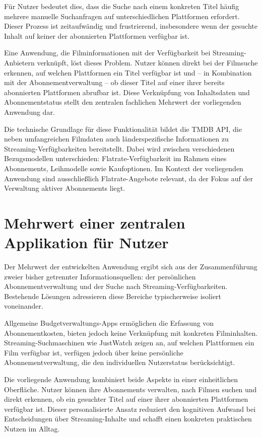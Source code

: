 Für Nutzer bedeutet dies, dass die Suche nach einem konkreten Titel häufig
mehrere manuelle Suchanfragen auf unterschiedlichen Plattformen erfordert.
Dieser Prozess ist zeitaufwändig und frustrierend, insbesondere wenn der
gesuchte Inhalt auf keiner der abonnierten Plattformen verfügbar ist.

Eine Anwendung, die Filminformationen mit der Verfügbarkeit bei
Streaming-Anbietern verknüpft, löst dieses Problem. Nutzer können direkt
bei der Filmsuche erkennen, auf welchen Plattformen ein Titel verfügbar
ist und -- in Kombination mit der Abonnementverwaltung -- ob dieser Titel
auf einer ihrer bereits abonnierten Plattformen abrufbar ist. Diese
Verknüpfung von Inhaltsdaten und Abonnementstatus stellt den zentralen
fachlichen Mehrwert der vorliegenden Anwendung dar.

Die technische Grundlage für diese Funktionalität bildet die TMDB API,
die neben umfangreichen Filmdaten auch länderspezifische Informationen
zu Streaming-Verfügbarkeiten bereitstellt. Dabei wird zwischen
verschiedenen Bezugsmodellen unterschieden: Flatrate-Verfügbarkeit
im Rahmen eines Abonnements, Leihmodelle sowie Kaufoptionen. Im Kontext
der vorliegenden Anwendung sind ausschließlich Flatrate-Angebote relevant,
da der Fokus auf der Verwaltung aktiver Abonnements liegt.


\section{Mehrwert einer zentralen Applikation für Nutzer}

Der Mehrwert der entwickelten Anwendung ergibt sich aus der Zusammenführung
zweier bisher getrennter Informationsquellen: der persönlichen
Abonnementverwaltung und der Suche nach Streaming-Verfügbarkeiten. Bestehende
Lösungen adressieren diese Bereiche typischerweise isoliert voneinander.

Allgemeine Budgetverwaltungs-Apps ermöglichen die Erfassung von
Abonnementkosten, bieten jedoch keine Verknüpfung mit konkreten Filminhalten.
Streaming-Suchmaschinen wie JustWatch zeigen an, auf welchen Plattformen ein
Film verfügbar ist, verfügen jedoch über keine persönliche
Abonnementverwaltung, die den individuellen Nutzerstatus berücksichtigt.

Die vorliegende Anwendung kombiniert beide Aspekte in einer einheitlichen
Oberfläche. Nutzer können ihre Abonnements verwalten, nach Filmen suchen
und direkt erkennen, ob ein gesuchter Titel auf einer ihrer abonnierten
Plattformen verfügbar ist. Dieser personalisierte Ansatz reduziert den
kognitiven Aufwand bei Entscheidungen über Streaming-Inhalte und schafft
einen konkreten praktischen Nutzen im Alltag.

